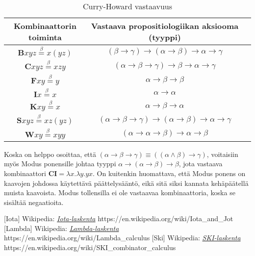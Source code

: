 \documentclass[a4paper,12pt]{amsart}
\begin{document}
\begin{table}
\caption{Curry-Howard vastaavuus}
\begin{tabular}{|c|c|c|}
\hline
Kombinaattorin toiminta & Vastaava propositiologiikan aksiooma (tyyppi) \\
\hline
\hline
$\mathbf{B}xyz\stackrel{\beta}{=} x(yz)$ & $(\beta\to\gamma)\to(\alpha\to\beta)\to\alpha\to\gamma$ \\
\hline
$\mathbf{C}xyz\stackrel{\beta}{=} xzy$ & $(\alpha\to\beta\to\gamma)\to\beta\to\alpha\to\gamma$ \\
\hline
$\mathbf{F}xy\stackrel{\beta}{=} y$ & $\alpha\to\beta\to\beta$ \\
\hline
$\mathbf{I}x\stackrel{\beta}{=} x$ & $\alpha\to\alpha$ \\
\hline
$\mathbf{K}xy\stackrel{\beta}{=} x$ & $\alpha\to\beta\to\alpha$ \\
\hline
$\mathbf{S}xyz\stackrel{\beta}{=} xz(yz)$ & $(\alpha\to\beta\to\gamma)\to(\alpha\to\beta)\to\alpha\to\gamma$ \\
\hline
$\mathbf{W}xy\stackrel{\beta}{=} xyy$ & $(\alpha\to\alpha\to\beta)\to\alpha\to\beta$ \\
\hline
\end{tabular}
\label{curryhoward}
\end{table}
Koska on helppo osoittaa, että $(\alpha\to\beta\to\gamma)\equiv((\alpha\land\beta)\to\gamma)$, voitaisiin myös Modus ponensille johtaa tyyppi $\alpha\to(\alpha\to\beta)\to\beta$, jota vastaava kombinaattori $\mathbf{CI}=\lambda x.\lambda y.yx$. On kuitenkin huomattava, että Modus ponens on kaavojen johdossa käytettävä päättelysääntö, eikä sitä siksi kannata kehäpäätellä muista kaavoista. Modus tollensilla ei ole vastaavaa kombinaattoria, koska se sisältää negaatioita.

\begin{thebibliography}{99}
[Iota] Wikipedia: \href{https://en.wikipedia.org/wiki/Iota\_and\_Jot}{\emph{Iota-laskenta}}
https://en.wikipedia.org/wiki/Iota\_and\_Jot
[Lambda] Wikipedia: \href{https://en.wikipedia.org/wiki/Lambda\_calculus}{\emph{Lambda-laskenta}} https://en.wikipedia.org/wiki/Lambda\_calculus
[Ski] Wikipedia: \href{https://en.wikipedia.org/wiki/SKI\_combinator\_calculus}{\emph{SKI-laskenta}} https://en.wikipedia.org/wiki/SKI\_combinator\_calculus
\end{thebibliography}
\end{document}
